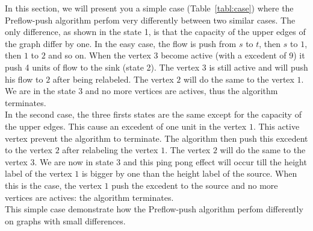 In this section, we will present you a simple case (Table~\ref{tabl:case}) where the Preflow-push algorithm perfom very differently between two similar cases. The only difference, as shown in the state 1, is that the capacity of the upper edges of the graph differ by one. In the easy case, the flow is push from $s$ to $t$, then $s$ to $1$, then $1$ to $2$ and so on. When the vertex $3$ become active (with a excedent of 9) it push 4 units of flow to the sink (state 2). The vertex $3$ is still active and will push his flow to $2$ after being relabeled. The vertex $2$ will do the same to the vertex $1$. We are in the state 3 and no more vertices are actives, thus the algorithm terminates. \\
In the second case, the three firsts states are the same except for the capacity of the upper edges. This cause an excedent of one unit in the vertex $1$. This active vertex prevent the algorithm to terminate. The algorithm then push this excedent to the vertex $2$ after relabeling the vertex $1$. The vertex $2$ will do the same to the vertex $3$. We are now in state 3 and this ping pong effect will occur till the height label of the vertex $1$ is bigger by one than the height label of the source. When this is the case, the vertex $1$ push the excedent to the source and no more vertices are actives: the algorithm terminates. \\

This simple case demonstrate how the Preflow-push algorithm perfom differently on graphs with small differences.


